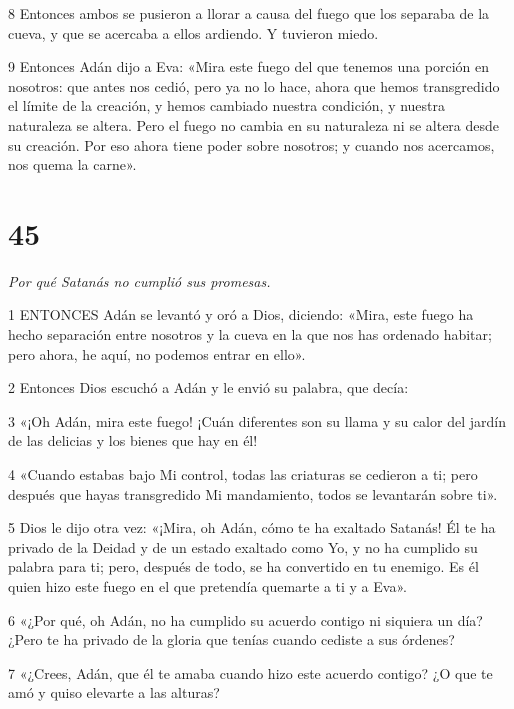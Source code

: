 \par 8 Entonces ambos se pusieron a llorar a causa del fuego que los separaba de la cueva, y que se acercaba a ellos ardiendo. Y tuvieron miedo.

\par 9 Entonces Adán dijo a Eva: «Mira este fuego del que tenemos una porción en nosotros: que antes nos cedió, pero ya no lo hace, ahora que hemos transgredido el límite de la creación, y hemos cambiado nuestra condición, y nuestra naturaleza se altera. Pero el fuego no cambia en su naturaleza ni se altera desde su creación. Por eso ahora tiene poder sobre nosotros; y cuando nos acercamos, nos quema la carne».

\chapter{45}

\par \textit{Por qué Satanás no cumplió sus promesas.}

\par 1 ENTONCES Adán se levantó y oró a Dios, diciendo: «Mira, este fuego ha hecho separación entre nosotros y la cueva en la que nos has ordenado habitar; pero ahora, he aquí, no podemos entrar en ello».

\par 2 Entonces Dios escuchó a Adán y le envió su palabra, que decía:

\par 3 «¡Oh Adán, mira este fuego! ¡Cuán diferentes son su llama y su calor del jardín de las delicias y los bienes que hay en él!

\par 4 «Cuando estabas bajo Mi control, todas las criaturas se cedieron a ti; pero después que hayas transgredido Mi mandamiento, todos se levantarán sobre ti».

\par 5 Dios le dijo otra vez: «¡Mira, oh Adán, cómo te ha exaltado Satanás! Él te ha privado de la Deidad y de un estado exaltado como Yo, y no ha cumplido su palabra para ti; pero, después de todo, se ha convertido en tu enemigo. Es él quien hizo este fuego en el que pretendía quemarte a ti y a Eva».

\par 6 «¿Por qué, oh Adán, no ha cumplido su acuerdo contigo ni siquiera un día? ¿Pero te ha privado de la gloria que tenías cuando cediste a sus órdenes?

\par 7 «¿Crees, Adán, que él te amaba cuando hizo este acuerdo contigo? ¿O que te amó y quiso elevarte a las alturas?

